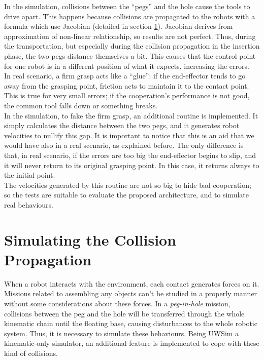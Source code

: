 In the simulation, collisions between the \enquote{pegs} and the hole cause the tools to drive apart. This happens because collisions are propagated to the robots with a formula which use Jacobian (detailed in section \ref{sec:forceConsideration}). Jacobian derives from approximation of non-linear relationship, so results are not perfect. Thus, during the transportation, but especially during the collision propagation in the insertion phase, the two pegs distance themselves a bit. This causes that the control point for one robot is in a different position of what it expects, increasing the errors.\\

In real scenario, a firm grasp acts like a \enquote{glue}: if the end-effector tends to go away from the grasping point, friction acts to maintain it to the contact point. This is true for very small errors; if the cooperation's performance is not good, the common tool falls down or something breaks.\\

In the simulation, to fake the firm grasp, an additional routine is implemented. It simply calculates the distance between the two pegs, and it generates robot velocities to nullify this gap. It is important to notice that this is an aid that we would have also in a real scenario, as explained before. The only difference is that, in real scenario, if the errors are too big the end-effector begins to slip, and it will never return to its original grasping point. In this case, it returns always to the initial point. \\

The velocities generated by this routine are not so big to hide bad cooperation; so the tests are suitable to evaluate the proposed architecture, and to simulate real behaviours.

\section{Simulating the Collision Propagation}
\label{sec:forceConsideration}
When a robot interacts with the environment, each contact generates forces on it. Missions related to assembling any objects can't be studied in a properly manner without some considerations about these forces. In a \textit{peg-in-hole} mission, collisions between the peg and the hole will be transferred through the whole kinematic chain until the floating base, causing disturbances to the whole robotic system. Thus, it is necessary to simulate these behaviours. Being UWSim a kinematic-only simulator, an additional feature is implemented to cope with these kind of collisions.\\ 

